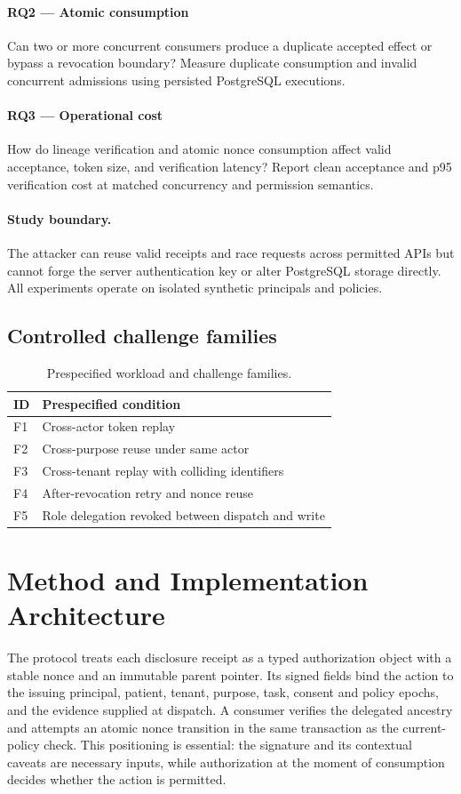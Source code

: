 \documentclass[11pt,a4paper]{article}
\begin{document}
\paragraph{RQ2 — Atomic consumption} Can two or more concurrent consumers produce a duplicate accepted effect or bypass a revocation boundary? Measure duplicate consumption and invalid concurrent admissions using persisted PostgreSQL executions.

\paragraph{RQ3 — Operational cost} How do lineage verification and atomic nonce consumption affect valid acceptance, token size, and verification latency? Report clean acceptance and p95 verification cost at matched concurrency and permission semantics.

\paragraph{Study boundary.} The attacker can reuse valid receipts and race requests across permitted APIs but cannot forge the server authentication key or alter PostgreSQL storage directly. All experiments operate on isolated synthetic principals and policies.

\subsection{Controlled challenge families}
\begin{table}[ht]
\centering\small
\caption{Prespecified workload and challenge families.}
\begin{tabularx}{\linewidth}{@{}lX@{}}\toprule
ID & Prespecified condition \\ \midrule
F1 & Cross-actor token replay \\ 
F2 & Cross-purpose reuse under same actor \\ 
F3 & Cross-tenant replay with colliding identifiers \\ 
F4 & After-revocation retry and nonce reuse \\ 
F5 & Role delegation revoked between dispatch and write \\ 
\bottomrule\end{tabularx}\end{table}

\section{Method and Implementation Architecture}
The protocol treats each disclosure receipt as a typed authorization object with a stable nonce and an immutable parent pointer. Its signed fields bind the action to the issuing principal, patient, tenant, purpose, task, consent and policy epochs, and the evidence supplied at dispatch. A consumer verifies the delegated ancestry and attempts an atomic nonce transition in the same transaction as the current-policy check. This positioning is essential: the signature and its contextual caveats are necessary inputs, while authorization at the moment of consumption decides whether the action is permitted.
\end{document}
